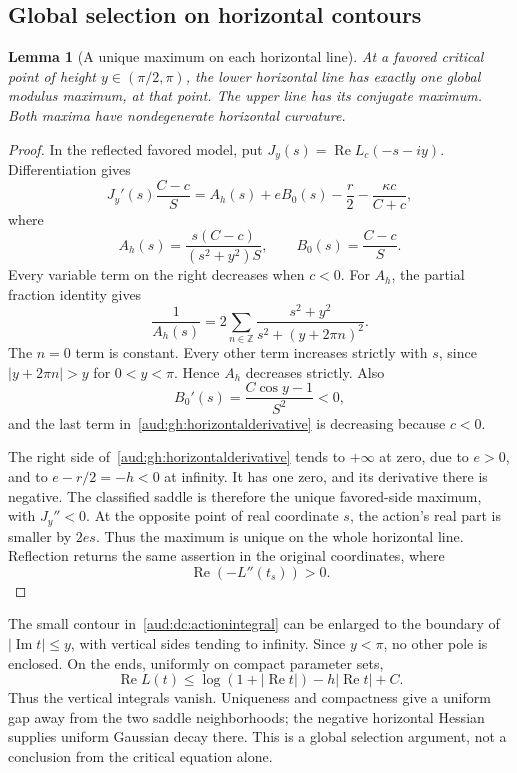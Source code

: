 \documentclass[11pt,a4paper]{article}
\numberwithin{equation}{section}
\newtheorem{lemma}[theorem]{Lemma}
\begin{document}
\subsection{Global selection on horizontal contours}
\begin{lemma}[A unique maximum on each horizontal line]\label{aud:gh:horizontal}
At a favored critical point of height $y\in(\pi/2,\pi)$, the lower horizontal line has exactly one global modulus maximum, at that point. The upper line has its conjugate maximum. Both maxima have nondegenerate horizontal curvature.
\end{lemma}
\begin{proof}
In the reflected favored model, put $J_y(s)=\operatorname{Re}L_c(-s-iy)$. Differentiation gives
\begin{equation}\label{aud:gh:horizontalderivative}
 J_y'(s)\frac{C-c}{S}
 =A_h(s)+eB_0(s)-\frac r2-\frac{\kappa c}{C+c},
\end{equation}
where
\[
 A_h(s)=\frac{s(C-c)}{(s^2+y^2)S},\qquad B_0(s)=\frac{C-c}{S}.
\]
Every variable term on the right decreases when $c<0$. For $A_h$, the partial fraction identity gives
\begin{equation}\label{aud:gh:periodic}
 \frac1{A_h(s)}=2\sum_{n\in\mathbb Z}
                 \frac{s^2+y^2}{s^2+(y+2\pi n)^2}.
\end{equation}
The $n=0$ term is constant. Every other term increases strictly with $s$, since $|y+2\pi n|>y$ for $0<y<\pi$. Hence $A_h$ decreases strictly. Also
\[
 B_0'(s)=\frac{C\cos y-1}{S^2}<0,
\]
and the last term in~\eqref{aud:gh:horizontalderivative} is decreasing because $c<0$.

The right side of~\eqref{aud:gh:horizontalderivative} tends to $+\infty$ at zero, due to $e>0$, and to $e-r/2=-h<0$ at infinity. It has one zero, and its derivative there is negative. The classified saddle is therefore the unique favored-side maximum, with $J_y''<0$. At the opposite point of real coordinate $s$, the action's real part is smaller by $2es$. Thus the maximum is unique on the whole horizontal line. Reflection returns the same assertion in the original coordinates, where
\[
 \operatorname{Re}(-L''(t_s))>0.
\]
\end{proof}

The small contour in~\eqref{aud:dc:actionintegral} can be enlarged to the boundary of $|\operatorname{Im}t|\le y$, with vertical sides tending to infinity. Since $y<\pi$, no other pole is enclosed. On the ends, uniformly on compact parameter sets,
\[
 \operatorname{Re}L(t)\le\log(1+|\operatorname{Re}t|)
                         -h|\operatorname{Re}t|+C.
\]
Thus the vertical integrals vanish. Uniqueness and compactness give a uniform gap away from the two saddle neighborhoods; the negative horizontal Hessian supplies uniform Gaussian decay there. This is a global selection argument, not a conclusion from the critical equation alone.
\end{document}
